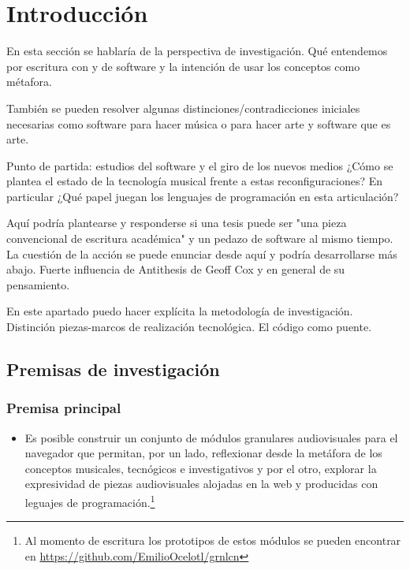 \chapter{Introducción}

En esta sección se hablaría de la perspectiva de investigación. Qué entendemos por escritura con y de software y la intención de usar los conceptos como métafora.

También se pueden resolver algunas distinciones/contradicciones iniciales necesarias como software para hacer música o para hacer arte y software que es arte. %

Punto de partida: estudios del software y el giro de los nuevos medios
¿Cómo se plantea el estado de la tecnología musical frente a estas reconfiguraciones? En particular ¿Qué papel juegan los lenguajes de programación en esta articulación? 

Aquí podría plantearse y responderse si una tesis puede ser "una pieza convencional de escritura académica" y un pedazo de software al mismo tiempo. 
La cuestión de la acción se puede enunciar desde aquí y podría desarrollarse más abajo. Fuerte influencia de Antithesis de Geoff Cox y en general de su pensamiento.

En este apartado puedo hacer explícita la metodología de investigación. 
Distinción piezas-marcos de realización tecnológica. El código como puente. 

\section{Premisas de investigación}


\subsection{Premisa principal}


\begin{itemize}
\item Es posible construir un conjunto de módulos granulares audiovisuales para el navegador que permitan, por un lado, reflexionar desde la metáfora de los conceptos musicales, tecnógicos e investigativos y por el otro, explorar la expresividad de piezas audiovisuales alojadas en la web y producidas con leguajes de programación.\footnote{Al momento de escritura los prototipos de estos módulos se pueden encontrar en \url{https://github.com/EmilioOcelotl/grnlcn}}
\end{itemize}

